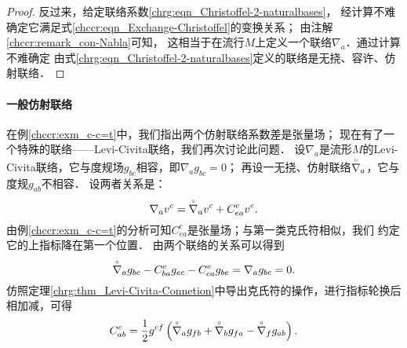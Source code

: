 \begin{proof}

  

    反过来，给定联络系数\eqref{chrg:eqn_Christoffel-2-naturalbases}，
    经计算不难确定它满足式\eqref{chccr:eqn_Exchange-Christoffel}的变换关系；
    由注解\ref{chccr:remark_con-Nabla}可知，
    这相当于在流行$M$上定义一个联络$\nabla_a$．通过计算不难确定
    由式\eqref{chrg:eqn_Christoffel-2-naturalbases}定义的联络是无挠、容许、仿射联络．
\end{proof}

\paragraph{一般仿射联络}\label{chrg:sec_clc}
在例\ref{chccr:exm_c-c=t}中，我们指出两个仿射联络系数差是张量场；
现在有了一个特殊的联络——Levi-Civita联络，我们再次讨论此问题．
设$\nabla_a$是流形$M$的Levi-Civita联络，它与度规场$g_{bc}$相容，即$\nabla_a g_{bc}=0$；
再设一无挠、仿射联络$\oversetmy{\circ}{\nabla}_a$，它与度规$g_{ab}$不相容．
设两者关系是：
\begin{equation}
    \nabla_{a} v^c = \oversetmy{\circ}{\nabla}_{a} v^c + C^c_{ea} v^e .
\end{equation}
由例\ref{chccr:exm_c-c=t}的分析可知$C^c_{ea}$是张量场；与第一类克氏符相似，我们
约定它的上指标降在第一个位置．
由两个联络的关系可以得到
\begin{equation}
    \oversetmy{\circ}{\nabla}_{a} g_{bc} - C^e_{ba} g_{ec} -C^e_{ca} g_{be}
    = \nabla_{a} g_{bc} =0 .
\end{equation}
仿照定理\ref{chrg:thm_Levi-Civita-Connetion}中导出克氏符的操作，进行指标轮换后相加减，可得
\begin{equation}
    {C}^c_{ab}=\frac{1}{2}g^{cf}\left(\oversetmy{\circ}{\nabla}_a g_{fb} + \oversetmy{\circ}{\nabla}_b g_{fa} 
    - \oversetmy{\circ}{\nabla}_f g_{ab}\right) .    
\end{equation}

